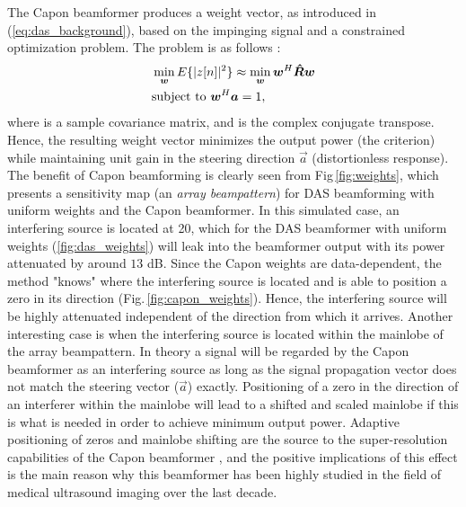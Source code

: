 The Capon beamformer produces a weight vector, as introduced in (\ref{eq:das_background}), based on the impinging signal and a constrained optimization problem. The problem is as follows \cite{Capon1969}:
\begin{align}
&\min_{\boldsymbol{w}} E\{|z[n]|^2\} \approx \min_{\boldsymbol{w}} \boldsymbol{w}^H \boldsymbol{\hat{R}} \boldsymbol{w} \label{eq:capon_optimization_criteria_background} \\
&\text{subject to } \boldsymbol{w}^H\boldsymbol{a} = 1,\notag
\end{align}
where  is a sample covariance matrix, and  is the complex conjugate transpose. Hence, the resulting weight vector minimizes the output power (the criterion) while maintaining unit gain in the steering direction $\vec{a}$ (distortionless response). The benefit of Capon beamforming is clearly seen from Fig\,\ref{fig:weights}, which presents a sensitivity map (an \textit{array beampattern}) for DAS beamforming with uniform weights and the Capon beamformer. In this simulated case, an interfering source is located at 20\degree{}, which for the DAS beamformer with uniform weights (\ref{fig:das_weights}) will leak into the beamformer output with its power attenuated by around $13$ dB. Since the Capon weights are data-dependent, the method "knows" where the interfering source is located and is able to position a zero in its direction (Fig.\,\ref{fig:capon_weights}). Hence, the interfering source will be highly attenuated independent of the direction from which it arrives. Another interesting case is when the interfering source is located within the mainlobe of the array beampattern. In theory a signal will be regarded by the Capon beamformer as an interfering source as long as the signal propagation vector does not match the steering vector ($\vec{a}$) exactly. Positioning of a zero in the direction of an interferer within the mainlobe will lead to a shifted and scaled mainlobe if this is what is needed in order to achieve minimum output power. Adaptive positioning of zeros and mainlobe shifting are the source to the super-resolution capabilities of the Capon beamformer \cite{Synnevag2007}, and the positive implications of this effect \cite{Synnevag2009} is the main reason why this beamformer has been highly studied in the field of medical ultrasound imaging over the last decade.

